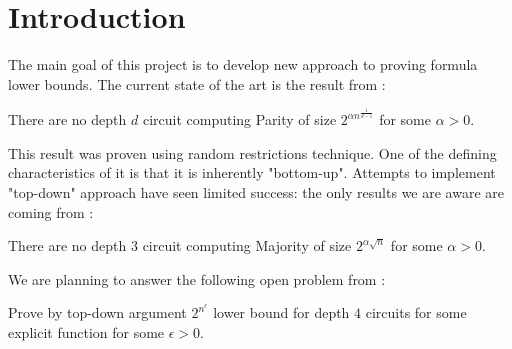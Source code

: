 \section{Introduction}

The main goal of this project is to develop new approach to proving formula lower bounds. The current state of the art is the result from \cite{hastad1986almost}:

\begin{theorem}

 There are no depth $d$ circuit computing Parity of size $2^{\alpha n^{\frac{1}{d-1}}}$ for some $\alpha>0$.

\end{theorem}

This result was proven using random restrictions technique. One of the defining characteristics of it is that it is inherently "bottom-up". Attempts to implement "top-down" approach have seen limited success: the only results we are aware are coming from \cite{haastad1995top,meir2017prediction}:

\begin{theorem}
There are no depth $3$ circuit computing Majority of size $2^{\alpha \sqrt{n}}$ for some $\alpha>0$.
\end{theorem}

We are planning to answer the following open problem from \cite{haastad1995top}:

\begin{open_problem}

Prove by top-down argument $2^{n^{\epsilon}}$ lower bound for depth $4$ circuits for some explicit function for some $\epsilon>0$.

\end{open_problem}


